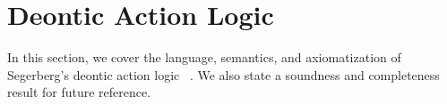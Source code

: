 \section{Deontic Action Logic}\label{section:dal}

In this section, we cover the language, semantics, and axiomatization of Segerberg's deontic action logic \DAL~\cite{Segerberg1982}.  We also state a soundness and completeness result for future reference.





